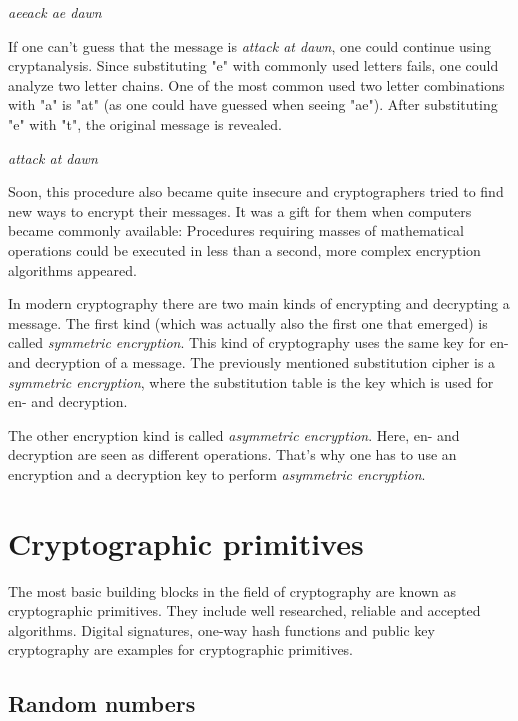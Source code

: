 \vspace{0.5cm}
\textit{aeeack ae dawn}
\vspace{0.5cm}

If one can't guess that the message is \textit{attack at dawn}, one could
continue using cryptanalysis. Since substituting "e" with commonly used letters
fails, one could analyze two letter chains. One of the most common used two
letter combinations with "a" is "at" (as one could have guessed when seeing
"ae").  After substituting "e" with "t", the original message is revealed.

\vspace{0.5cm}
\textit{attack at dawn}
\vspace{0.5cm}

Soon, this procedure also became quite insecure and cryptographers tried to
find new ways to encrypt their messages. It was a gift for them when computers
became commonly available: Procedures requiring masses of mathematical
operations could be executed in less than a second, more complex encryption
algorithms appeared.

In modern cryptography there are two main kinds of encrypting and decrypting a
message. The first kind (which was actually also the first one that emerged) is
called \textit{symmetric encryption}. This kind of cryptography uses the same
key for en- and decryption of a message. The previously mentioned substitution
cipher is a \textit{symmetric encryption}, where the substitution table is the
key which is used for en- and decryption.

The other encryption kind is called \textit{asymmetric encryption}. Here, en-
and decryption are seen as different operations. That's why one has to use an
encryption and a decryption key to perform \textit{asymmetric encryption}.

\section{Cryptographic primitives}

The most basic building blocks in the field of cryptography are known as
cryptographic primitives. They include well researched, reliable and accepted
algorithms. Digital signatures, one-way hash functions and public key
cryptography are examples for cryptographic primitives.

\subsection{Random numbers}

